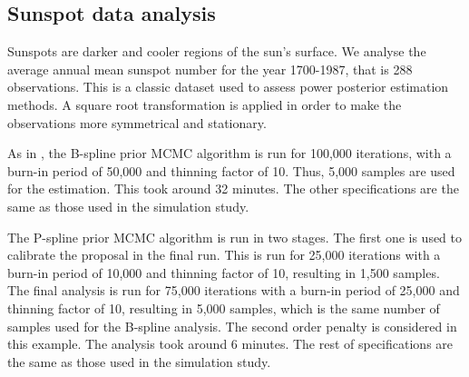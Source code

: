 \documentclass[aps,reprint,amsmath,amssymb,showpacs,showkeys]{revtex4-1}%
\begin{document}
\subsection{Sunspot data analysis}

Sunspots are darker and cooler regions of the sun's surface.  We analyse the average annual mean sunspot number for the year 1700-1987, that is 288 observations.  This is a classic dataset used to assess power posterior estimation methods.  A square root transformation is applied in order to make the observations more symmetrical and stationary. 

As in \cite{Edwards2018}, the B-spline prior MCMC algorithm is run for 100,000 iterations, with a burn-in period of 50,000 and thinning factor of 10.  Thus, 5,000 samples are used for the estimation.  This took around 32 minutes.  The other specifications are the same as those used in the simulation study.

The P-spline prior MCMC algorithm is run in two stages.  The first one is used to calibrate the proposal in the final run.  This is run for 25,000 iterations with a burn-in period of 10,000 and thinning factor of 10, resulting in 1,500 samples.  The final analysis is run for 75,000 iterations with a burn-in period of 25,000 and thinning factor of 10, resulting in 5,000 samples, which is the same number of samples used for the B-spline analysis.  The second order penalty is considered in this example.  The analysis took around 6 minutes.  The rest of specifications are the same as those used in the simulation study.
\end{document}
